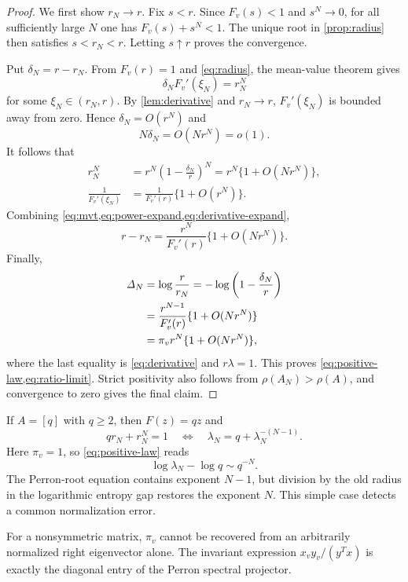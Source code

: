 \begin{proof}
We first show $r_N\to r$.  Fix $s<r$.  Since $F_v(s)<1$ and $s^N\to0$, for
all sufficiently large $N$ one has $F_v(s)+s^N<1$.  The unique root in
\cref{prop:radius} then satisfies $s<r_N<r$.  Letting $s\uparrow r$ proves
the convergence.

Put $\delta_N=r-r_N$.  From
$F_v(r)=1$ and \cref{eq:radius}, the mean-value theorem gives
\begin{equation}
 \delta_NF_v'(\xi_N)=r_N^N
 \label{eq:mvt}
\end{equation}
for some $\xi_N\in(r_N,r)$.  By \cref{lem:derivative} and $r_N\to r$,
$F_v'(\xi_N)$ is bounded away from zero.  Hence
$\delta_N=O(r^N)$ and
\[
 N\delta_N=O(Nr^N)=o(1).
\]
It follows that
\begin{align}
 r_N^N
 &=r^N\left(1-\frac{\delta_N}{r}\right)^N
 =r^N\{1+O(Nr^N)\},
 \label{eq:power-expand}\\
 \frac1{F_v'(\xi_N)}
 &=\frac1{F_v'(r)}\{1+O(r^N)\}.
 \label{eq:derivative-expand}
\end{align}
Combining \cref{eq:mvt,eq:power-expand,eq:derivative-expand},
\[
 r-r_N=\frac{r^N}{F_v'(r)}\{1+O(Nr^N)\}.
\]
Finally,
\begin{align*}
 \mathit\Delta_N
 &=\log\frac r{r_N}
 =-\log\left(1-\frac{\delta_N}{r}\right)\\
 &=\frac{r^{N-1}}{F_v'(r)}\{1+O(Nr^N)\}\\
 &=\pi_vr^N\{1+O(Nr^N)\},
\end{align*}
where the last equality is \cref{eq:derivative} and $r\lambda=1$.
This proves \cref{eq:positive-law,eq:ratio-limit}.  Strict positivity also
follows from $\rho(A_N)>\rho(A)$, and convergence to zero gives the final
claim.
\end{proof}

\begin{example}
\label{ex:one-vertex}
If $A=[q]$ with $q\ge2$, then $F(z)=qz$ and
\[
 qr_N+r_N^N=1
 \quad\Longleftrightarrow\quad
 \lambda_N=q+\lambda_N^{-(N-1)}.
\]
Here $\pi_v=1$, so \cref{eq:positive-law} reads
\[
 \log\lambda_N-\log q\sim q^{-N}.
\]
The Perron-root equation contains exponent $N-1$, but division by the old
radius in the logarithmic entropy gap restores the exponent $N$.  This
simple case detects a common normalization error.
\end{example}

\begin{remark}
For a nonsymmetric matrix, $\pi_v$ cannot be recovered from an arbitrarily
normalized right eigenvector alone.  The invariant expression
$x_vy_v/(y^Tx)$ is exactly the diagonal entry of the Perron spectral
projector.
\end{remark}
